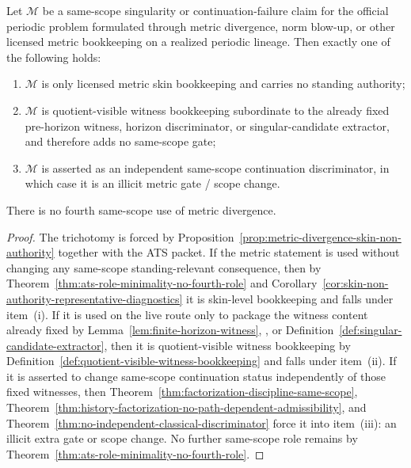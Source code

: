 \begin{manualproposition}
\label{prop:quotient-visible-witness-vs-illicit-metric-gate}
Let $\mathcal M$ be a same-scope singularity or continuation-failure claim for the official periodic problem formulated through metric divergence, norm blow-up, or other licensed metric bookkeeping on a realized periodic lineage. Then exactly one of the following holds:
\begin{enumerate}[label=(\roman*), leftmargin=2.2em]
\item $\mathcal M$ is only licensed metric skin bookkeeping and carries no standing authority;
\item $\mathcal M$ is quotient-visible witness bookkeeping subordinate to the already fixed pre-horizon witness, horizon discriminator, or singular-candidate extractor, and therefore adds no same-scope gate;
\item $\mathcal M$ is asserted as an independent same-scope continuation discriminator, in which case it is an illicit metric gate / scope change.
\end{enumerate}
There is no fourth same-scope use of metric divergence.
\end{manualproposition}

\begin{proof}
The trichotomy is forced by Proposition~\ref{prop:metric-divergence-skin-non-authority} together with the ATS packet. If the metric statement is used without changing any same-scope standing-relevant consequence, then by Theorem~\ref{thm:ats-role-minimality-no-fourth-role} and Corollary~\ref{cor:skin-non-authority-representative-diagnostics} it is skin-level bookkeeping and falls under item~(i). If it is used on the live route only to package the witness content already fixed by Lemma~\ref{lem:finite-horizon-witness}, \HorizonDetectabilityRef{}, or Definition~\ref{def:singular-candidate-extractor}, then it is quotient-visible witness bookkeeping by Definition~\ref{def:quotient-visible-witness-bookkeeping} and falls under item~(ii). If it is asserted to change same-scope continuation status independently of those fixed witnesses, then Theorem~\ref{thm:factorization-discipline-same-scope}, Theorem~\ref{thm:history-factorization-no-path-dependent-admissibility}, and Theorem~\ref{thm:no-independent-classical-discriminator} force it into item~(iii): an illicit extra gate or scope change. No further same-scope role remains by Theorem~\ref{thm:ats-role-minimality-no-fourth-role}.
\end{proof}

